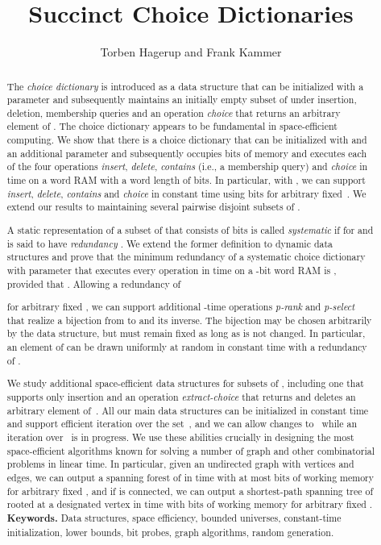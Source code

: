 \documentclass[envcountsame,envcountsect,undated,nolinenumbers]{lnthi}
\title{Succinct Choice Dictionaries}
\author{Torben Hagerup and Frank Kammer}
\institute{Institut f\"ur Informatik, Universit\"at Augsburg, 86135
Augsburg, Germany
\email{\{hagerup,kammer\}@informatik.uni-augsburg.de}}
\def\Tvn#1{\hbox{\textit{#1\/}}}
\begin{document}
\maketitle{}

\begin{abstract}The \emph{choice dictionary} is introduced as a
data structure that can be initialized
with a parameter 
and subsequently maintains an initially empty subset 
of  under insertion, deletion, membership queries
and an operation \Tvn{choice} that returns
an arbitrary element of .
The choice dictionary appears to be fundamental
in space-efficient computing.
We show that there is a choice dictionary
that can be initialized
with  and an additional parameter 
and subsequently
occupies  bits of memory
and executes each of the four operations \Tvn{insert},
\Tvn{delete}, \Tvn{contains} (i.e., a membership query)
and \Tvn{choice} in  time
on a word RAM with a word length of  bits.
In particular, with ,
we can support \Tvn{insert}, \Tvn{delete},
\Tvn{contains} and \Tvn{choice} in constant time using
 bits for arbitrary fixed~.
We extend our results to maintaining several
pairwise disjoint subsets of .

A static representation of a subset  of 
that consists of  bits 
is called \emph{systematic} if
 for 
and is said to have \emph{redundancy} .
We extend the former definition to dynamic data structures
and prove that the minimum redundancy of a systematic choice
dictionary with parameter  that executes
every operation in  time on a
-bit word RAM is ,
provided that .
Allowing
a redundancy of

for arbitrary fixed ,
we can support additional -time operations
\Tvn{p-rank} and \Tvn{p-select} that
realize a bijection from  to 
and its inverse.
The bijection may be chosen arbitrarily by the
data structure, but must remain fixed
as long as  is not changed.
In particular, an element of  can be
drawn uniformly at random in constant time
with a redundancy of .

We study additional space-efficient
data structures for subsets  of , including
one that supports only insertion and an
operation \Tvn{extract-choice} that returns
and deletes an arbitrary element of~.
All our main data structures can be
initialized in constant time and
support efficient iteration over the set~, and we can allow
changes to~ while an iteration over~ is in progress.
We use these abilities crucially in designing the most
space-efficient algorithms known for solving
a number of graph and other combinatorial problems
in linear time.
In particular, given an undirected graph  with
 vertices and  edges, we can output a spanning
forest of  in  time with at most
 bits of
working memory for arbitrary fixed ,
and if  is connected,
we can output a shortest-path spanning
tree of  rooted at a designated vertex
in  time
with  bits
of working memory for arbitrary fixed .\\

{\bf Keywords.} Data structures, space efficiency, bounded universes,
constant-time initialization, lower bounds, bit probes,
graph algorithms, random generation.
\end{abstract}
\end{document}
